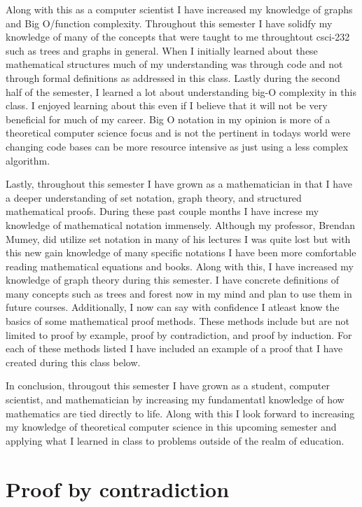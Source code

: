 \documentclass{article}
\begin{document}
Along with this as a computer scientist I have increased my knowledge of graphs and Big O/function complexity.
Throughout this semester I have solidfy my knowledge of many of the concepts that were taught to me throughtout 
csci-232 such as trees and graphs in general. When I initially learned about these mathematical structures much 
of my understanding was through code and not through formal definitions as addressed in this class. Lastly during 
the second half of the semester, I learned a lot about understanding big-O complexity in this class. I enjoyed 
learning about this even if I believe that it will not be very beneficial for much of my career. Big O notation 
in my opinion is more of a theoretical computer science focus and is not the pertinent in todays world were 
changing code bases can be more resource intensive as just using a less complex algorithm.

Lastly, throughout this semester I have grown as a mathematician in that I have a deeper understanding of 
set notation, graph theory, and structured mathematical proofs. During these past couple months I 
have increse my knowledge of mathematical notation immensely. Although my professor, Brendan Mumey, did utilize 
set notation in many of his lectures I was quite lost but with this new gain knowledge of many specific notations 
I have been more comfortable reading mathematical equations and books. Along with this, I have increased my 
knowledge of graph theory during this semester. I have concrete definitions of many concepts such as trees and 
forest now in my mind and plan to use them in future courses. Additionally, I now can say with confidence 
I atleast know the basics of some mathematical proof methods. These methods include but are not limited to 
proof by example, proof by contradiction, and proof by induction. For each of these methods listed I have included
an example of a proof that I have created during this class below.

In conclusion, througout this semester I have grown as a student, computer scientist, and mathematician by 
increasing my fundamentatl knowledge of how mathematics are tied directly to life. Along with this I look forward 
to increasing my knowledge of theoretical computer science in this upcoming semester and applying what I learned 
in class to problems outside of the realm of education.

\appendix
\section{Proof by contradiction} 
  
\end{document}
